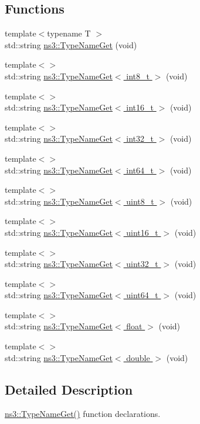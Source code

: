 \subsection*{Functions}
\begin{DoxyCompactItemize}
\item 
{\footnotesize template$<$typename T $>$ }\\std\+::string \hyperlink{group__attributeimpl_gaa575643602994c3f6c7e580fcd5ef041}{ns3\+::\+Type\+Name\+Get} (void)
\end{DoxyCompactItemize}
{\bf }\par
\begin{DoxyCompactItemize}
\item 
{\footnotesize template$<$$>$ }\\std\+::string \hyperlink{group__attributeimpl_gaf2000b8baeaaa56a818ea1b3e707542e}{ns3\+::\+Type\+Name\+Get$<$ int8\+\_\+t $>$} (void)
\item 
{\footnotesize template$<$$>$ }\\std\+::string \hyperlink{group__attributeimpl_gaa497aafbaa514d27fb1c8a44723eab25}{ns3\+::\+Type\+Name\+Get$<$ int16\+\_\+t $>$} (void)
\item 
{\footnotesize template$<$$>$ }\\std\+::string \hyperlink{group__attributeimpl_gaa80c01003e8f97a13ce91964d0657bf8}{ns3\+::\+Type\+Name\+Get$<$ int32\+\_\+t $>$} (void)
\item 
{\footnotesize template$<$$>$ }\\std\+::string \hyperlink{group__attributeimpl_gabce9a2b4cd9746a9f2367a15a2446fae}{ns3\+::\+Type\+Name\+Get$<$ int64\+\_\+t $>$} (void)
\item 
{\footnotesize template$<$$>$ }\\std\+::string \hyperlink{group__attributeimpl_ga5d93dfb7262b2958de81883d1289c2ee}{ns3\+::\+Type\+Name\+Get$<$ uint8\+\_\+t $>$} (void)
\item 
{\footnotesize template$<$$>$ }\\std\+::string \hyperlink{group__attributeimpl_gad3a57d52e5dc9eb143cf9365ba4a3654}{ns3\+::\+Type\+Name\+Get$<$ uint16\+\_\+t $>$} (void)
\item 
{\footnotesize template$<$$>$ }\\std\+::string \hyperlink{group__attributeimpl_ga43f5f8c28d59d17ce8cbb9aaef6440fb}{ns3\+::\+Type\+Name\+Get$<$ uint32\+\_\+t $>$} (void)
\item 
{\footnotesize template$<$$>$ }\\std\+::string \hyperlink{group__attributeimpl_ga25468dd5b76562e1b359af6342b78f59}{ns3\+::\+Type\+Name\+Get$<$ uint64\+\_\+t $>$} (void)
\item 
{\footnotesize template$<$$>$ }\\std\+::string \hyperlink{group__attributeimpl_ga3161e1f308c7602aa2787fcbbef096fe}{ns3\+::\+Type\+Name\+Get$<$ float $>$} (void)
\item 
{\footnotesize template$<$$>$ }\\std\+::string \hyperlink{group__attributeimpl_gacddf452951d93d7419c247082fc18764}{ns3\+::\+Type\+Name\+Get$<$ double $>$} (void)
\end{DoxyCompactItemize}



\subsection{Detailed Description}
\hyperlink{group__attributeimpl_gaa575643602994c3f6c7e580fcd5ef041}{ns3\+::\+Type\+Name\+Get()} function declarations. 